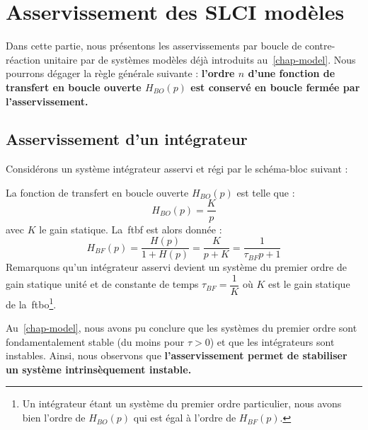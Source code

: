 \section{Asservissement des SLCI modèles}
Dans cette partie, nous présentons les asservissements par boucle 
de contre-réaction unitaire par de systèmes modèles déjà introduits 
au~\cref{chap-model}. Nous pourrons dégager la règle générale suivante :
\textbf{l'ordre $n$ d'une fonction de transfert en boucle ouverte $H_{BO}(p)$
est conservé en boucle fermée par l'asservissement.}
\subsection{Asservissement d'un intégrateur}
Considérons un système intégrateur asservi et régi par le schéma-bloc suivant :
\begin{center}
    
\end{center}
La fonction de transfert en boucle ouverte $H_{BO}(p)$ est telle que :
\[
H_{BO}(p)=\dfrac{K}{p}
\]
avec $K$ le gain statique. 
La~\gls{ftbf} est alors donnée :
\[
H_{BF}(p)=\dfrac{H(p)}{1+H(p)}=\dfrac{K}{p+K}=\dfrac{1}{\tau_{BF} p+1}
\]
Remarquons qu'un intégrateur asservi devient un système du premier 
ordre de gain statique unité et de constante de temps $\tau_{BF}=\dfrac{1}{K}$ 
où $K$ est le gain statique de la~\gls{ftbo}\footnote{Un intégrateur étant 
un système du premier ordre particulier, nous avons bien l'ordre de $H_{BO}(p)$ 
qui est égal à l'ordre de $H_{BF}(p)$.}. 

Au~\cref{chap-model}, nous avons pu conclure que les systèmes du premier ordre 
sont fondamentalement stable (du moins pour $\tau>0$) et que les intégrateurs 
sont instables.
Ainsi, nous observons que \textbf{l'asservissement permet de stabiliser un 
système intrinsèquement instable.} 
